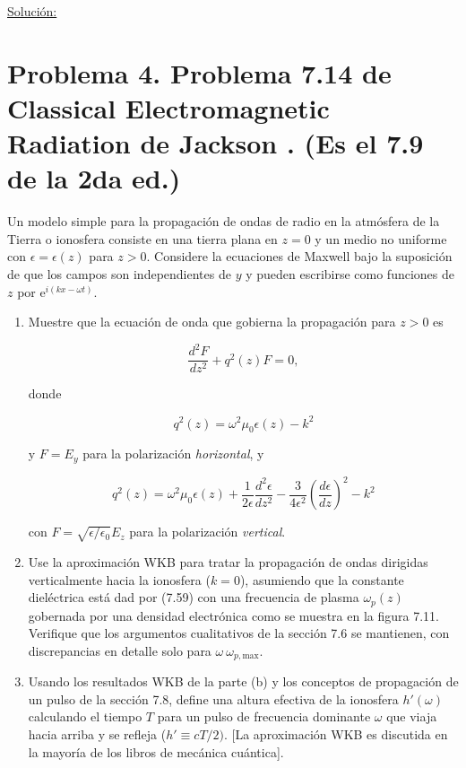 \documentclass[a4paper,11pt]{article}
\numberwithin{equation}{section}
\newcommand{\euler}{\mathrm{e}}
\begin{document}
\vspace{.3cm}

\underline{Solución:} \vspace{.3cm}

\newpage

\section{Problema 4. Problema 7.14 de Classical Electromagnetic Radiation
de Jackson \cite{jackson}. (Es el 7.9 de la 2da ed.)}

Un modelo simple para la propagación de ondas de radio en la atmósfera de la 
Tierra o ionosfera consiste en una tierra plana en $z = 0$ y un medio no 
uniforme con $\epsilon = \epsilon(z)$ para $z > 0$. Considere la ecuaciones 
de Maxwell bajo la suposición de que los campos son independientes de $y$ y 
pueden escribirse como funciones de $z$ por $\euler^{i(kx - \omega t)}$. 

\begin{enumerate}[label=\textbf{(\alph*)}]
 \item Muestre que la ecuación de onda que gobierna la propagación para $z > 0$ 
 es 
 
 $$
 \frac{d^2 F}{dz^2} + q^2(z) F = 0,
 $$
 
 donde 
 
 $$
 q^2(z) = \omega^2 \mu_0 \epsilon(z) - k^2
 $$
 
 y $F = E_y$ para la polarización \emph{horizontal}, y 
 
 $$
 q^2(z) = \omega^2 \mu_0 \epsilon(z) + \frac{1}{2\epsilon}\frac{d^2 \epsilon}{dz^2} 
 - \frac{3}{4\epsilon^2}\left(\frac{d \epsilon}{d z} \right)^2 - k^2
 $$
 
 con $F = \sqrt{\epsilon/\epsilon_0}E_z$ para la polarización \emph{vertical}.
 
 \item Use la aproximación WKB para tratar la propagación de ondas dirigidas 
 verticalmente hacia la ionosfera ($k = 0$), asumiendo que la constante dieléctrica 
 está dad por (7.59) con una frecuencia de plasma $\omega_p(z)$ gobernada por una 
 densidad electrónica como se muestra en la figura 7.11. Verifique que los argumentos 
 cualitativos de la sección 7.6 se mantienen, con discrepancias en detalle solo 
 para $\omega ~ \omega_{p,\text{max}}$.
 
 \item Usando los resultados WKB de la parte (b) y los conceptos de propagación 
 de un pulso de la sección 7.8, define una altura efectiva de la ionosfera $h'(\omega)$ 
 calculando el tiempo $T$ para un pulso de frecuencia dominante $\omega$ que viaja 
 hacia arriba y se refleja ($h' \equiv cT/2)$. [La aproximación WKB es discutida 
 en la mayoría de los libros de mecánica cuántica].
\end{enumerate}
\end{document}
